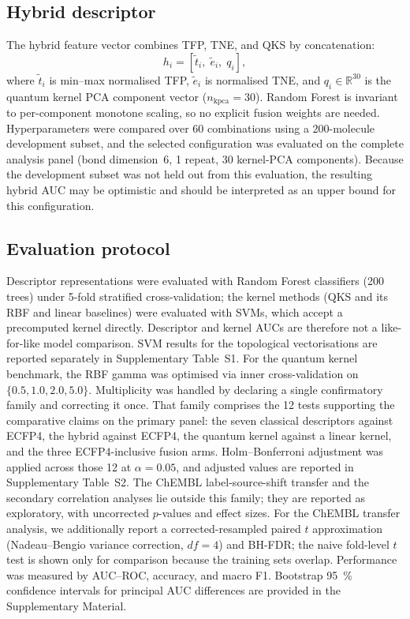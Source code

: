 \documentclass[11pt,a4paper]{article}
\begin{document}
\subsection{Hybrid descriptor}

The hybrid feature vector combines TFP, TNE, and QKS by concatenation:
\begin{equation}
h_i = \left[\tilde{t}_i,\; \tilde{e}_i,\; q_i\right],
\end{equation}
where $\tilde{t}_i$ is min--max normalised TFP, $\tilde{e}_i$ is normalised TNE, and $q_i \in \mathbb{R}^{30}$ is the quantum kernel PCA component vector ($n_{\text{kpca}}=30$). Random Forest is invariant to per-component monotone scaling, so no explicit fusion weights are needed. Hyperparameters were compared over 60 combinations using a \num{200}-molecule development subset, and the selected configuration was evaluated on the complete analysis panel (bond dimension~6, \num{1} repeat, \num{30} kernel-PCA components). Because the development subset was not held out from this evaluation, the resulting hybrid AUC may be optimistic and should be interpreted as an upper bound for this configuration.

\subsection{Evaluation protocol}

Descriptor representations were evaluated with Random Forest classifiers (\num{200} trees) under 5-fold stratified cross-validation; the kernel methods (QKS and its RBF and linear baselines) were evaluated with SVMs, which accept a precomputed kernel directly. Descriptor and kernel AUCs are therefore not a like-for-like model comparison. SVM results for the topological vectorisations are reported separately in Supplementary Table~S1. For the quantum kernel benchmark, the RBF gamma was optimised via inner cross-validation on $\{0.5, 1.0, 2.0, 5.0\}$. Multiplicity was handled by declaring a single confirmatory family and correcting it once. That family comprises the \num{12} tests supporting the comparative claims on the primary panel: the seven classical descriptors against ECFP4, the hybrid against ECFP4, the quantum kernel against a linear kernel, and the three ECFP4-inclusive fusion arms. Holm--Bonferroni adjustment was applied across those \num{12} at $\alpha = \num{0.05}$, and adjusted values are reported in Supplementary Table~S2. The ChEMBL label-source-shift transfer and the secondary correlation analyses lie outside this family; they are reported as exploratory, with uncorrected $p$-values and effect sizes. For the ChEMBL transfer analysis, we additionally report a corrected-resampled paired $t$ approximation (Nadeau--Bengio variance correction, $df = 4$) and BH-FDR; the naive fold-level $t$ test is shown only for comparison because the training sets overlap. Performance was measured by AUC--ROC, accuracy, and macro F1. Bootstrap \qty{95}{\percent} confidence intervals for principal AUC differences are provided in the Supplementary Material.
\end{document}
